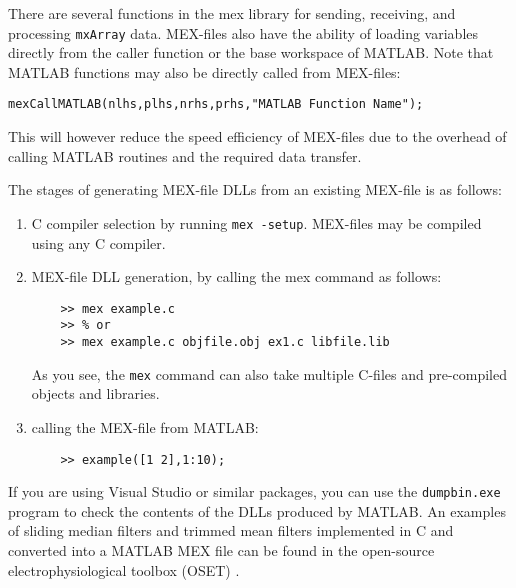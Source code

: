 \documentclass[10pt,a4paper]{article}
\newcounter{example}[section]
\begin{document}
There are several functions in the mex library for sending, receiving, and processing \texttt{mxArray} data. MEX-files also have the ability of loading variables directly from the caller function or the base workspace of MATLAB. Note that MATLAB functions may also be directly called from MEX-files:
\begin{lstlisting}
mexCallMATLAB(nlhs,plhs,nrhs,prhs,"MATLAB Function Name");
\end{lstlisting}
This will however reduce the speed efficiency of MEX-files due to the overhead of calling MATLAB routines and the required data transfer.

The stages of generating MEX-file DLLs from an existing MEX-file is as follows:
\begin{enumerate}
\item C compiler selection by running \texttt{mex -setup}. MEX-files may be compiled using any C compiler. %
\item MEX-file DLL generation, by calling the mex command as follows:
\begin{lstlisting}
	>> mex example.c
	>> % or
	>> mex example.c objfile.obj ex1.c libfile.lib
\end{lstlisting}
As you see, the \texttt{mex} command can also take multiple C-files and pre-compiled objects and libraries.
\item calling the MEX-file from MATLAB:
\begin{lstlisting}
	>> example([1 2],1:10);
\end{lstlisting}
\end{enumerate}

If you are using Visual Studio or similar packages, you can use the \texttt{dumpbin.exe} program to check the contents of the DLLs produced by MATLAB. An examples of sliding median filters and trimmed mean filters implemented in C and converted into a MATLAB MEX file can be found in the open-source electrophysiological toolbox (OSET) \citep{OSET3.14}.
\flushleft


\nocite{*}
\end{document}
